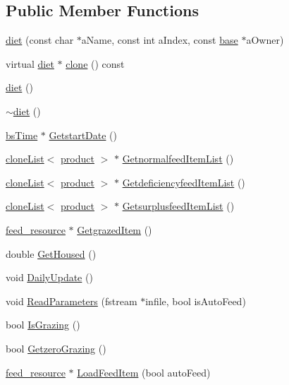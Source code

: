 \subsection*{Public Member Functions}
\begin{DoxyCompactItemize}
\item 
\hyperlink{classdiet_a3316a2f0434fba4fdfcfc32bcbae57f9}{diet} (const char $\ast$aName, const int aIndex, const \hyperlink{classbase}{base} $\ast$aOwner)
\item 
virtual \hyperlink{classdiet}{diet} $\ast$ \hyperlink{classdiet_aeb5ccbac2a03f2eff34a332699bd6fb0}{clone} () const 
\item 
\hyperlink{classdiet_a7aa7b6bf6b7849a2c809b3937afef657}{diet} ()
\item 
\hyperlink{classdiet_a84ae4cd84a77e5f6b7ca487cc8083ad4}{$\sim$diet} ()
\item 
\hyperlink{classbs_time}{bsTime} $\ast$ \hyperlink{classdiet_a66183f7ce65baa947f8aa77fa9521a65}{GetstartDate} ()
\item 
\hyperlink{classclone_list}{cloneList}$<$ \hyperlink{classproduct}{product} $>$ $\ast$ \hyperlink{classdiet_a985a9a46ad9be5ead29bc69e736934da}{GetnormalfeedItemList} ()
\item 
\hyperlink{classclone_list}{cloneList}$<$ \hyperlink{classproduct}{product} $>$ $\ast$ \hyperlink{classdiet_afe8f51300ef50da0919c8a1b95e2cdee}{GetdeficiencyfeedItemList} ()
\item 
\hyperlink{classclone_list}{cloneList}$<$ \hyperlink{classproduct}{product} $>$ $\ast$ \hyperlink{classdiet_a0d62c160e28ce12200c5bed5eede85f3}{GetsurplusfeedItemList} ()
\item 
\hyperlink{classfeed__resource}{feed\_\-resource} $\ast$ \hyperlink{classdiet_a813b9f27c3b008eb71400a79a7495d8c}{GetgrazedItem} ()
\item 
double \hyperlink{classdiet_a19917e60acd3811c778cc304813b2031}{GetHoused} ()
\item 
void \hyperlink{classdiet_af16ff6316a93c7e9c45fed7e0a7aaaaa}{DailyUpdate} ()
\item 
void \hyperlink{classdiet_ad0f3531dcbf70d82e8af546c17f83cee}{ReadParameters} (fstream $\ast$infile, bool isAutoFeed)
\item 
bool \hyperlink{classdiet_a41b73f38d9233f3c233b697378ebfafd}{IsGrazing} ()
\item 
bool \hyperlink{classdiet_a9a9f6b947cd297e0f800e2116ae17b82}{GetzeroGrazing} ()
\item 
\hyperlink{classfeed__resource}{feed\_\-resource} $\ast$ \hyperlink{classdiet_a0857655a60f21eb4df63f768f103aee6}{LoadFeedItem} (bool autoFeed)

\end{DoxyCompactItemize}
